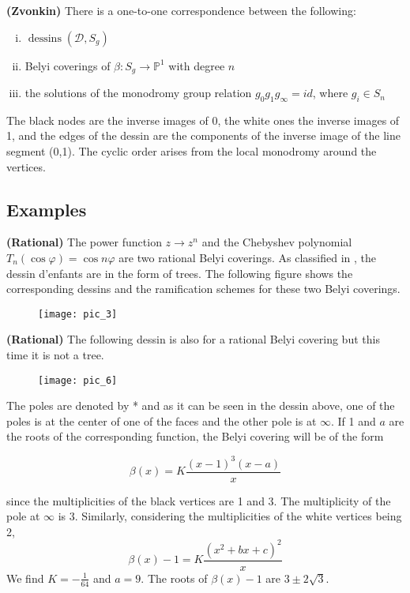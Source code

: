  \begin{thm} {\bf (Zvonkin)}
    There is a one-to-one correspondence between the following:
\begin{enumerate}[(i)]
    \item $\operatorname{dessins}\left(\mathcal{D}, S_{g}\right)$
    \item Belyi coverings of $\beta: S_{g} \rightarrow \mathbb{P}^{1}$ with degree $n$
    \item the solutions of the monodromy group relation $g_{0} g_{1} g_{\infty}=i d$, where $g_{i} \in S_{n}$
\end{enumerate}
\end{thm}
The black nodes are the inverse images of 0, the white ones the inverse images of 1, and the edges of the dessin are the components of the inverse image of the line segment (0,1). The cyclic order arises from the local monodromy around the vertices.

\subsection{Examples}

\begin{example}\label{Example 2.1.6}
{\bf(Rational)} 
The power function $z\to z^n$ and the Chebyshev polynomial $T_n(\cos\varphi)=\cos n\varphi$ are two rational Belyi coverings. As classified in \cite{A09a}, the dessin d'enfants are in the form of trees. The following figure shows the corresponding dessins and the ramification schemes for these two Belyi coverings.
\newpage
\begin{figure}[htp]
\texttt{[image: pic\_3]}
\end{figure}
\end{example}

\begin{example}{\bf(Rational)}\label{Example 2.1.7} The following dessin is also for a rational Belyi covering but this time it is not a tree.

\begin{figure}[htp]
\texttt{[image: pic\_6]}
\end{figure}

  The poles are denoted by * and as it can be seen in the dessin above, one of the poles is at the center of one of the faces and the other pole is at $\infty$. If 1 and $a$ are the roots of the corresponding function, the Belyi covering will be of the form

$$
\beta(x)=K \frac{(x-1)^{3}(x-a)}{x}
$$

since the multiplicities of the black vertices are 1 and 3. The multiplicity of the pole at $\infty$ is 3. Similarly, considering the multiplicities of the white vertices being 2,
$$
\beta(x)-1=K \frac{(x^2+bx+c)^2}{x}
$$
We find $K=-\frac{1}{64}$ and $a=9$. The roots of $\beta(x)-1$ are $3 \pm 2 \sqrt{3}$.
\end{example}


